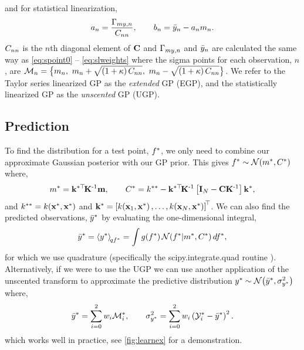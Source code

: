 \documentclass{article} %
\begin{document}
and for statistical linearization,
\begin{equation}
    a_n = \frac{\Gamma_{my,n}}{C_{nn}},
    \qquad
    b_n = \bar{y}_n - a_nm_n.
\end{equation}
$C_{nn}$ is the $n$th diagonal element of $\mathbf{C}$ and
$\Gamma_{my,n}$ and $\bar{y}_n$ are calculated the same way as
\eqref{eq:spoint0} -- \eqref{eq:slweights} where the sigma points for each
observation, $n$, are $\mathcal{M}_{n} = \big\{m_n,~m_n +
\sqrt{\left({1 + \kappa}\right)C_{nn}},~m_n - \sqrt{\left({1 +
        \kappa}\right)C_{nn}}\big\}$. We refer to the Taylor series linearized
GP as the \emph{extended} GP (EGP), and the statistically linearized GP as the
\emph{unscented} GP (UGP). 


\subsection{Prediction}

To find the distribution for a test point, $f^{*}$, 
we only need to combine our approximate Gaussian posterior with 
our GP prior. This
gives $f^{*} \sim \mathcal{N}\!\left({m^{*}, C^{*}}\right)$ where,
\begin{equation}
    m^{*} = \mathbf{k}^{*\top}\!\mathbf{K}^{\text{-}1}\mathbf{m},
    \qquad
    C^{*} = k^{**} - \mathbf{k}^{*\top}\!\mathbf{K}^{\text{-}1}\left[{\mathbf{I}_{N} -
        \mathbf{C}\mathbf{K}^{\text{-}1}}\right]\mathbf{k}^{*},
\end{equation}
and $k^{**} = k\!\left({\mathbf{x}^{*}, \mathbf{x}^{*}}\right)$ and $\mathbf{k}^{*}
= \left[{k\!\left({\mathbf{x}_1, \mathbf{x}^{*}}\right), \ldots, k\!\left({\mathbf{x}_N,
        \mathbf{x}^{*}}\right)}\right]^{\!\top}$. We can also find the predicted observations,
$\bar{y}^{*}$ by evaluating the one-dimensional integral,
\begin{equation}
    \bar{y}^{*} = \left\langle{\ensuremath{y}\ensuremath{^{*}}}\right\rangle_{\!{qf^{*}}} = \int
        g\!\left({{f^{*}}}\right) \mathcal{N}\!\left({f^{*}}\middle\vert{\ensuremath{m}\ensuremath{^{*}},
            \ensuremath{C}\ensuremath{^{*}}}\right) df^{*},
\end{equation}
for which we use quadrature (specifically the scipy.integrate.quad routine
\cite{JonesScipy}). Alternatively, if we were to use the UGP we can use another
application of the unscented transform to approximate the predictive
distribution $y^{*} \sim \mathcal{N}\!\left({\bar{y}^{*}, \sigma^2_{y^{*}}}\right)$ where,
\begin{equation}
    \bar{y}^{*} = \sum^2_{i=0} w_i \mathcal{M}_i^{*}, \qquad 
    \sigma^2_{y^{*}} = \sum^2_{i=0} w_i \left({\mathcal{Y}_i^{*} -
        \bar{y}^{*}}\right)^2.
    \label{eq:slpred}
\end{equation}
which works well in practice, see \autoref{fig:learnex} for a
demonstration.
\end{document}
